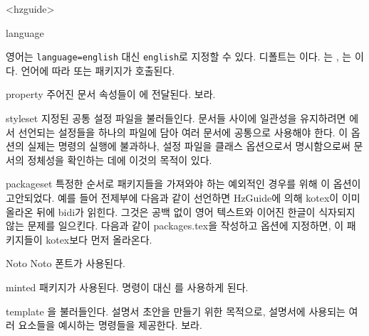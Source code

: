 \documentclass[minted]{hzguide}
\begin{document}
\begin{macros}<hzguide>
\item[language] 

영어는 \texttt{language=english} 대신 \texttt{english}로 지정할 수 있다.
디폴트는 이다. 
는 , 는 이다.
언어에 따라  또는  패키지가 호출된다.

\item[property] 
주어진 문서 속성들이 \macro{\DocumentSetup}에 전달된다.
\를 보라.

\item[styleset] 
지정된 공통 설정 파일을 불러들인다.
문서들 사이에 일관성을 유지하려면 에서 선언되는 설정들을 하나의 파일에 담아 여러 문서에 공통으로 사용해야 한다.
이 옵션의 실제는 \macro{} 명령의 실행에 불과하나, 설정 파일을 클래스 옵션으로서 명시함으로써 문서의 정체성을 확인하는 데에 이것의 목적이 있다.

\item[packageset] 
특정한 순서로 패키지들을 가져와야 하는 예외적인 경우를 위해 이 옵션이 고안되었다.
예를 들어 전제부에 다음과 같이 선언하면 HzGuide에 의해 kotex이 이미 올라온 뒤에 bidi가 읽힌다.
그것은 공백 없이 영어 텍스트와 이어진 한글이 식자되지 않는 문제를 일으킨다. 
다음과 같이 packages.tex을 작성하고  옵션에 지정하면, 이 패키지들이 kotex보다 먼저 올라온다.

\begin{code}
\usepackage{stackengine}
\usepackage{ulem}
\usepackage{bidi}
\end{code}


\item[Noto] \keyvalueTF
Noto 폰트가 사용된다.

\item[minted] \keyvalueTF
{} 패키지가 사용된다. \macro{\coderead} 명령이 \macro{} 대신 를 사용하게 된다.

\item[template] \keyvalueTF
{}을 불러들인다. 설명서 초안을 만들기 위한 목적으로, 설명서에 사용되는 여러 요소들을 예시하는 명령들을 제공한다.
\을 보라.
\end{macros}
\end{document}
